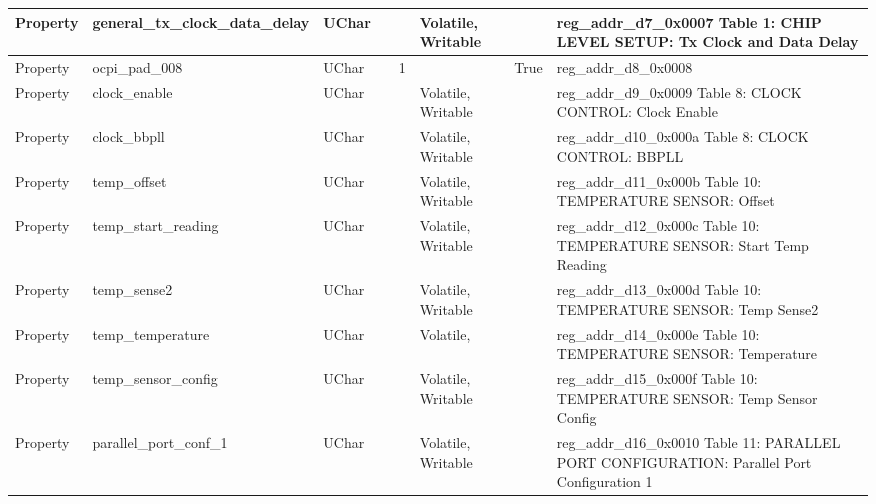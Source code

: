 \documentclass{article}
\begin{document}
\begin{scriptsize}
\begin{longtable}{|p{2cm}|p{5cm}|p{1cm}|p{2cm}|p{2cm}|p{1.75cm}|p{1.5cm}|p{5.1cm}|}
  \hline
  Property & general\_tx\_clock\_data\_delay                          & UChar &                  &                  & Volatile,  Writable &         & reg\_addr\_d7\_0x0007   Table 1:  CHIP LEVEL SETUP: Tx Clock and Data Delay \\
  \hline
  Property & ocpi\_pad\_008                                           & UChar &                  & 1                &                     & True    & reg\_addr\_d8\_0x0008 \\
  \hline
  Property & clock\_enable                                            & UChar &                  &                  & Volatile,  Writable &         & reg\_addr\_d9\_0x0009   Table 8:  CLOCK CONTROL: Clock Enable \\
  \hline
  Property & clock\_bbpll                                             & UChar &                  &                  & Volatile,  Writable &         & reg\_addr\_d10\_0x000a  Table 8:  CLOCK CONTROL: BBPLL \\
  \hline
  Property & temp\_offset                                             & UChar &                  &                  & Volatile,  Writable &         & reg\_addr\_d11\_0x000b  Table 10: TEMPERATURE SENSOR: Offset \\
  \hline
  Property & temp\_start\_reading                                     & UChar &                  &                  & Volatile,  Writable &         & reg\_addr\_d12\_0x000c  Table 10: TEMPERATURE SENSOR: Start Temp Reading \\
  \hline
  Property & temp\_sense2                                             & UChar &                  &                  & Volatile,  Writable &         & reg\_addr\_d13\_0x000d  Table 10: TEMPERATURE SENSOR: Temp Sense2 \\
  \hline
  Property & temp\_temperature                                        & UChar &                  &                  & Volatile,           &         & reg\_addr\_d14\_0x000e  Table 10: TEMPERATURE SENSOR: Temperature \\
  \hline
  Property & temp\_sensor\_config                                     & UChar &                  &                  & Volatile,  Writable &         & reg\_addr\_d15\_0x000f  Table 10: TEMPERATURE SENSOR: Temp Sensor Config \\
  \hline
  Property & parallel\_port\_conf\_1                                  & UChar &                  &                  & Volatile,  Writable &         & reg\_addr\_d16\_0x0010  Table 11: PARALLEL PORT CONFIGURATION: Parallel Port Configuration 1 \\

\end{longtable}
\end{scriptsize}
\end{document}
